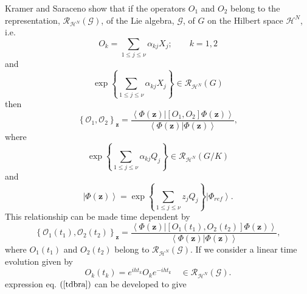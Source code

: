 \documentclass[aps,preprint]{revtex4}%
\begin{document}
Kramer and Saraceno \cite{KS} show that if the operators $O_{1}$ and $O_{2}$
belong to the representation, $\mathcal{R}_{\mathcal{H}^{N}}\left(
\mathcal{G}\right)  $, of the Lie algebra, $\mathcal{G}$, of $G$ on the
Hilbert space $\mathcal{H}^{N}$, i.e.
\begin{equation}
O_{k}=\sum_{1\leq j\leq\nu}\alpha_{kj}X_{j};\qquad k=1,2
\end{equation}
and
\begin{equation}
\exp\left\{  \sum_{1\leq j\leq\nu}\alpha_{kj}X_{j}\right\}  \in\mathcal{R}%
_{\mathcal{H}^{N}}\left(  G\right)
\end{equation}
then
\begin{equation}
\left\{  \mathcal{O}_{1},\mathcal{O}_{2}\right\}  _{\mathbf{z}}=\frac
{\left\langle \left.  \Phi\left(  \mathbf{z}\right)  \right\vert \left[
O_{1},O_{2}\right]  \Phi\left(  \mathbf{z}\right)  \right\rangle
}{\left\langle \left.  \Phi\left(  \mathbf{z}\right)  \right\vert \Phi\left(
\mathbf{z}\right)  \right\rangle },
\end{equation}
where
\begin{equation}
\exp\left\{  \sum_{1\leq j\leq\nu}\alpha_{kj}Q_{j}\right\}  \in\mathcal{R}%
_{\mathcal{H}^{N}}\left(  G/K\right)
\end{equation}
and
\begin{equation}
\left\vert \Phi\left(  \mathbf{z}\right)  \right\rangle =\exp\left\{
\sum_{1\leq j\leq\nu}z_{j}Q_{j}\right\}  \left\vert \Phi_{ref}\right\rangle .
\end{equation}
This relationship can be made time dependent by
\begin{equation}
\left\{  \mathcal{O}_{1}\left(  t_{1}\right)  ,\mathcal{O}_{2}\left(
t_{2}\right)  \right\}  _{\mathbf{z}}=\frac{\left\langle \left.  \Phi\left(
\mathbf{z}\right)  \right\vert \left[  O_{1}\left(  t_{1}\right)
,O_{2}\left(  t_{2}\right)  \right]  \Phi\left(  \mathbf{z}\right)
\right\rangle }{\left\langle \left.  \Phi\left(  \mathbf{z}\right)
\right\vert \Phi\left(  \mathbf{z}\right)  \right\rangle },
\end{equation}
where $O_{1}\left(  t_{1}\right)  $ and $O_{2}\left(  t_{2}\right)  $ belong
to $\mathcal{R}_{\mathcal{H}^{N}}\left(  \mathcal{G}\right)  .$ If we consider
a linear time evolution given by
\begin{equation}
O_{k}\left(  t_{k}\right)  =e^{iht_{k}}O_{k}e^{-iht_{k}}\quad\in
\mathcal{R}_{\mathcal{H}^{N}}\left(  \mathcal{G}\right)  .
\end{equation}
expression eq. $\left(  \ref{tdbra}\right)  $ can be developed to give
\end{document}
